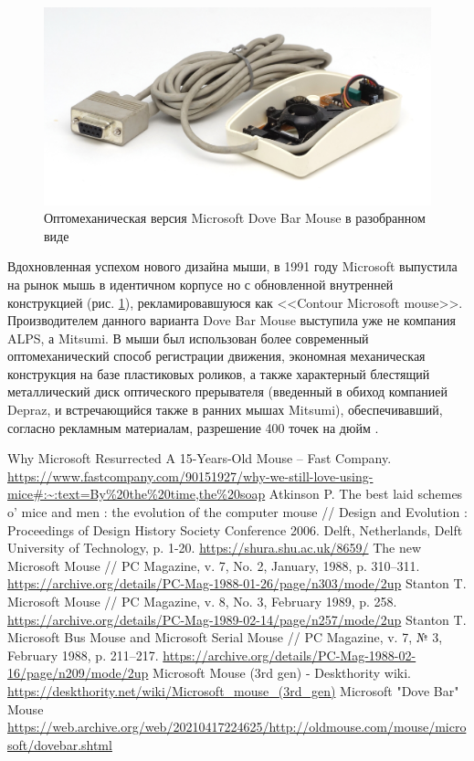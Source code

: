 \documentclass[11pt, a4paper]{article}
\begin{document}
\begin{figure}[h]
    \centering
    \includegraphics[scale=0.6]{1987_microsoft_dove_bar_mouse/inside2_60.jpg}
    \caption{Оптомеханическая версия Microsoft Dove Bar Mouse в разобранном виде}
    \label{fig:MicrosoftDoveBarInside2}
\end{figure}

Вдохновленная успехом нового дизайна мыши,  в 1991 году Microsoft выпустила на рынок мышь в идентичном корпусе но с обновленной внутренней конструкцией (рис. \ref{fig:MicrosoftDoveBarInside2}), рекламировавшуюся как <<Contour Microsoft mouse>>. Производителем данного варианта Dove Bar Mouse выступила уже не компания ALPS, а Mitsumi. В мыши был использован более современный оптомеханический способ регистрации движения, экономная механическая конструкция на базе пластиковых роликов, а также характерный блестящий металлический диск оптического прерывателя (введенный в обиход компанией Depraz, и встречающийся также в ранних мышах Mitsumi), обеспечивавший, согласно рекламным материалам, разрешение 400 точек на дюйм \cite{doveBarMouseOldMouses}.

\begin{thebibliography}{9}
 Why Microsoft Resurrected A 15-Years-Old Mouse -- Fast Company. \url{https://www.fastcompany.com/90151927/why-we-still-love-using-mice#:~:text=By%20the%20time,the%20soap}
 Atkinson P. The best laid schemes o’ mice and men : the evolution of the computer mouse // Design and Evolution : Proceedings of Design History Society Conference 2006. Delft, Netherlands, Delft University of Technology, p. 1-20. \url{https://shura.shu.ac.uk/8659/}
 The new Microsoft Mouse // PC Magazine, v. 7, No. 2, January, 1988, p. 310--311. \url{https://archive.org/details/PC-Mag-1988-01-26/page/n303/mode/2up}
 Stanton T. Microsoft Mouse // PC Magazine, v. 8, No. 3, February 1989, p. 258. \url{https://archive.org/details/PC-Mag-1989-02-14/page/n257/mode/2up}
 Stanton T. Microsoft Bus Mouse and Microsoft Serial Mouse // PC Magazine, v. 7, № 3, February 1988, p. 211--217. \url{https://archive.org/details/PC-Mag-1988-02-16/page/n209/mode/2up}
 Microsoft Mouse (3rd gen) - Deskthority wiki. \url{https://deskthority.net/wiki/Microsoft_mouse_(3rd_gen)}
 Microsoft "Dove Bar" Mouse \url{https://web.archive.org/web/20210417224625/http://oldmouse.com/mouse/microsoft/dovebar.shtml}
\end{thebibliography}
\end{document}
